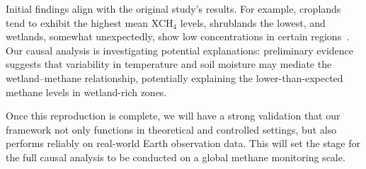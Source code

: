Initial findings align with the original study’s results. For example, croplands tend to exhibit the highest mean XCH$_4$ levels, shrublands the lowest, and wetlands, somewhat unexpectedly, show low concentrations in certain regions~\cite{Karoff2023}. Our causal analysis is investigating potential explanations: preliminary evidence suggests that variability in temperature and soil moisture may mediate the wetland–methane relationship, potentially explaining the lower-than-expected methane levels in wetland-rich zones.

Once this reproduction is complete, we will have a strong validation that our framework not only functions in theoretical and controlled settings, but also performs reliably on real-world Earth observation data. This will set the stage for the full causal analysis to be conducted on a global methane monitoring scale.

